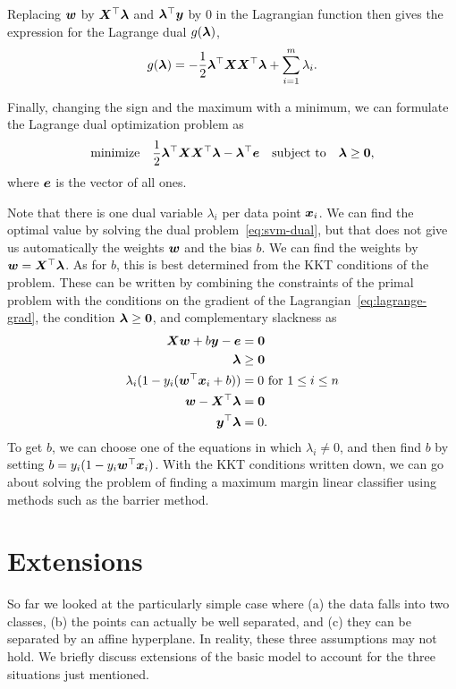Replacing $\bm{w}$ by $\bm{X}^{\top}\bm{\lambda}$ and $\bm{\lambda}^{\top}\bm{y}$ by $0$ in the Lagrangian function then gives the expression for the Lagrange dual $g(\bm{\lambda})$,
\begin{equation*}
  g(\bm{\lambda}) = -\frac{1}{2}\bm{\lambda}^{\top}\bm{X}\bm{X}^{\top}\bm{\lambda}+\sum_{i=1}^m \lambda_i.
\end{equation*}

Finally, changing the sign and the maximum with a minimum, we can formulate the Lagrange dual optimization problem as
\begin{equation}\label{eq:svm-dual}
\text{minimize}\quad \frac{1}{2}\bm{\lambda}^{\top}\bm{X}\bm{X}^{\top}\bm{\lambda}- \bm{\lambda}^{\top}\bm{e} \quad\text{subject to}\quad \bm{\lambda}\geq \bm{0},
\end{equation}
where $\bm{e}$ is the vector of all ones. 

Note that there is one dual variable $\lambda_i$ per data point $\bm{x}_i$. We can find the optimal value by solving the dual problem~\eqref{eq:svm-dual}, but that does not give us automatically the weights $\bm{w}$ and the bias $b$. We can find the weights by $\bm{w}=\bm{X}^{\top}\bm{\lambda}$. As for $b$, this is best determined from the KKT conditions of the problem. These can be written by combining the constraints of the primal problem with the conditions on the gradient of the Lagrangian~\eqref{eq:lagrange-grad}, the condition $\bm{\lambda}\geq \bm{0}$, and complementary slackness as
\begin{align*}
   \bm{X}\bm{w}+b\bm{y}-\bm{e} &= \bm{0}\\
   \bm{\lambda}&\geq \bm{0}\\
   \lambda_i (1-y_i(\bm{w}^{\top}\bm{x}_i+b)) &= 0 \text{ for } 1\leq i\leq n\\
   \bm{w}-\bm{X}^{\top}\bm{\lambda} &= \bm{0}\\
   \bm{y}^{\top}\bm{\lambda} &= 0.
\end{align*}
To get $b$, we can choose one of the equations in which $\lambda_i\neq 0$, and then find $b$ by setting $b= y_i(1-y_i\bm{w}^{\top}\bm{x}_i)$. With the KKT conditions written down, we can go about solving the problem of finding a maximum margin linear classifier using methods such as the barrier method.

\section{Extensions}
So far we looked at the particularly simple case where (a) the data falls into two classes, (b) the points can actually be well separated, and (c) they can be separated by an affine hyperplane. In reality, these three assumptions may not hold. We briefly discuss extensions of the basic model to account for the three situations just mentioned.

